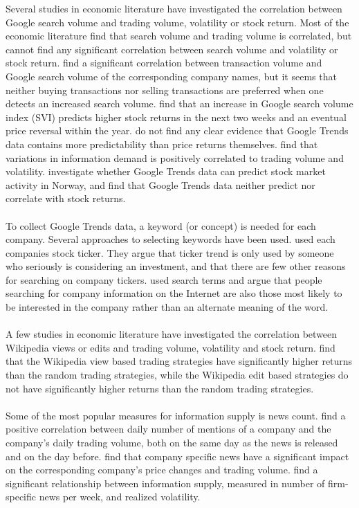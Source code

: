 Several studies in economic literature have investigated the correlation between Google search volume and trading volume, volatility or stock return. Most of the economic literature find that search volume and trading volume is correlated, but cannot find any significant correlation between search volume and volatility or stock return. \cite{preis} find a significant correlation between transaction volume and Google search volume of the corresponding company names, but it seems that neither buying transactions nor selling transactions are preferred when one detects an increased search volume. \cite{engelberg} find that an increase in Google search volume index (SVI) predicts higher stock returns in the next two weeks and an eventual price reversal within the year. \cite{challet2014} do not find any clear evidence that Google Trends data contains more predictability than price returns themselves. \cite{vlastakis} find that variations in information demand is positively correlated to trading volume and volatility. \cite{neri} investigate whether Google Trends data can predict stock market activity in Norway, and find that Google Trends data neither predict nor correlate with stock returns.  
\\\\
To collect Google Trends data, a keyword (or concept) is needed for each company.  Several approaches to selecting keywords have been used. \cite{joseph} used each companies stock ticker. They argue that ticker trend is only used by someone who seriously is considering an investment, and that there are few other reasons for searching on company tickers. \cite{bijl} used search terms and argue that people searching for company information on the Internet are also those most likely to be interested in the company rather than an alternate meaning of the word.
\\\\
A few studies in economic literature have investigated the correlation between Wikipedia views or edits and trading volume, volatility and stock return. \cite{moat} find that the Wikipedia view based trading strategies have significantly higher returns than the random trading strategies, while the Wikipedia edit based strategies do not have significantly higher returns than the random trading strategies. 
\\\\
Some of the most popular measures for information supply is news count. \cite{preis2013} find a positive correlation between daily number of mentions of a company and the company's daily trading volume, both on the same day as the news is released and on the day before. \cite{ryan} find that company specific news have a significant impact on the corresponding company's price changes and trading volume. \cite{vlastakis} find a significant relationship between information supply, measured in number of firm-specific news per week, and realized volatility. 

